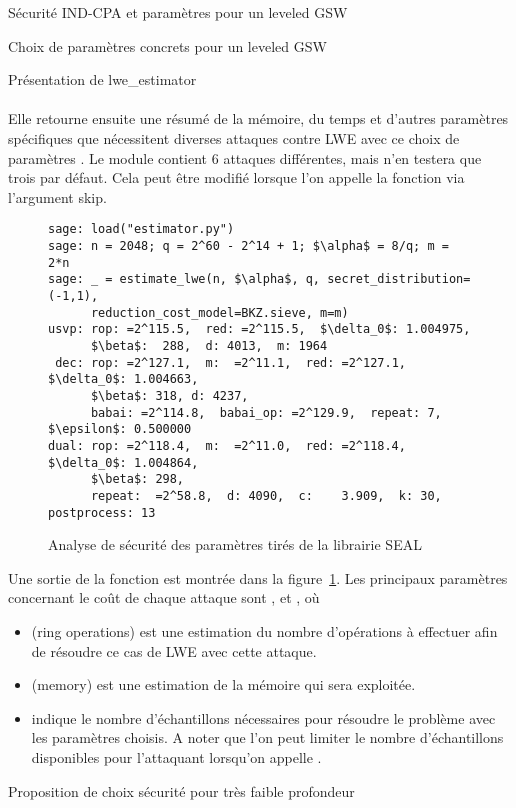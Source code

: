 \begin{section}{Sécurité IND-CPA et paramètres pour un leveled GSW}
\begin{subsection}{Choix de paramètres concrets pour un leveled GSW}
\begin{subsubsection}{Présentation de lwe\_estimator}
\paragraph{}
Elle retourne ensuite une résumé de la mémoire, du temps et d'autres paramètres spécifiques que nécessitent
diverses attaques contre LWE avec ce choix de paramètres . Le module contient 6 attaques différentes, mais n'en testera que
trois par défaut. Cela peut être modifié lorsque l'on appelle la fonction  via l'argument skip.
\flushleft
\begin{figure}
\begin{lstlisting}[mathescape=true]
sage: load("estimator.py")
sage: n = 2048; q = 2^60 - 2^14 + 1; $\alpha$ = 8/q; m = 2*n
sage: _ = estimate_lwe(n, $\alpha$, q, secret_distribution=(-1,1), 
	  reduction_cost_model=BKZ.sieve, m=m)
usvp: rop: =2^115.5,  red: =2^115.5,  $\delta_0$: 1.004975,  
      $\beta$:  288,  d: 4013,  m: 1964
 dec: rop: =2^127.1,  m:  =2^11.1,  red: =2^127.1,  $\delta_0$: 1.004663,  
      $\beta$: 318, d: 4237,  
      babai: =2^114.8,  babai_op: =2^129.9,  repeat: 7,  $\epsilon$: 0.500000
dual: rop: =2^118.4,  m:  =2^11.0,  red: =2^118.4,  $\delta_0$: 1.004864,  
      $\beta$: 298,  
      repeat:  =2^58.8,  d: 4090,  c:    3.909,  k: 30, postprocess: 13
\end{lstlisting}
\caption{Analyse de sécurité des paramètres tirés de la librairie SEAL}
\label{fig:seal_estimate}
\end{figure}


\vspace{0.2cm}
Une sortie de la fonction  est montrée dans la figure~\ref{fig:seal_estimate}.
Les principaux paramètres concernant le coût de chaque attaque sont ,  et , où

\begin{itemize}
\item {} (ring operations) est une estimation du nombre d'opérations à effectuer afin de résoudre ce cas de LWE avec cette attaque.
\item  {} (memory) est une estimation de la mémoire qui sera exploitée.
\item {} indique le nombre d'échantillons nécessaires pour résoudre le problème avec les paramètres choisis. 
A noter que l'on peut limiter le nombre d'échantillons disponibles pour l'attaquant
lorsqu'on appelle .
\end{itemize}

\end{subsubsection}
\begin{subsubsection}{Proposition de choix sécurité pour très faible profondeur} \label{sec:choix_concrets}

\end{subsubsection}
\end{subsection}
\end{section}
